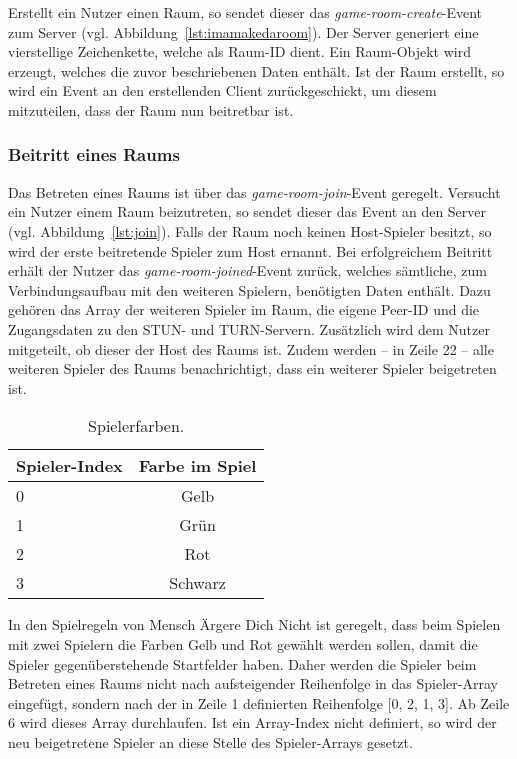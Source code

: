 Erstellt ein Nutzer einen Raum, so sendet dieser das \textit{game-room-create}-Event zum Server (vgl. Abbildung~\ref{lst:imamakedaroom}). Der Server generiert eine vierstellige Zeichenkette, welche als Raum-ID dient. Ein Raum-Objekt wird erzeugt, welches die zuvor beschriebenen Daten enthält. Ist der Raum erstellt, so wird ein Event an den erstellenden Client zurückgeschickt, um diesem mitzuteilen, dass der Raum nun beitretbar ist.\par

\subsubsection{Beitritt eines Raums}
Das Betreten eines Raums ist über das \textit{game-room-join}-Event geregelt. Versucht ein Nutzer einem Raum beizutreten, so sendet dieser das Event an den Server (vgl. Abbildung~\ref{lst:join}). Falls der Raum noch keinen Host-Spieler besitzt, so wird der erste beitretende Spieler zum Host ernannt. Bei erfolgreichem Beitritt erhält der Nutzer das \textit{game-room-joined}-Event zurück, welches sämtliche, zum Verbindungsaufbau mit den weiteren Spielern, benötigten Daten enthält. Dazu gehören das Array der weiteren Spieler im Raum, die eigene Peer-ID und die Zugangsdaten zu den \acs{STUN}- und \acs{TURN}-Servern. Zusätzlich wird dem Nutzer mitgeteilt, ob dieser der Host des Raums ist. Zudem werden -- in Zeile 22 -- alle weiteren Spieler des Raums benachrichtigt, dass ein weiterer Spieler beigetreten ist.\par

\begin{table}[ht]
\centering
\begin{tabular}[t]{lc}
\toprule
Spieler-Index&Farbe im Spiel\\
\midrule
0&Gelb\\
1&Grün\\
2&Rot\\
3&Schwarz\\
\bottomrule
\end{tabular}
\caption{Spielerfarben.}
\label{table:playercolors}
\end{table}

In den Spielregeln von \glqq{}Mensch Ärgere Dich Nicht\grqq{} ist geregelt, dass beim Spielen mit zwei Spielern die Farben Gelb und Rot gewählt werden sollen, damit die Spieler gegenüberstehende Startfelder haben. Daher werden die Spieler beim Betreten eines Raums nicht nach aufsteigender Reihenfolge in das Spieler-Array eingefügt, sondern nach der in Zeile 1 definierten Reihenfolge [0, 2, 1, 3]. Ab Zeile 6 wird dieses Array durchlaufen. Ist ein Array-Index nicht definiert, so wird der neu beigetretene Spieler an diese Stelle des Spieler-Arrays gesetzt.\par


